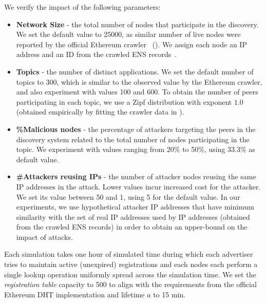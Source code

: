 We verify the impact of the following parameters:
 \begin{itemize}
     \item \textbf{Network Size} - the total number of nodes that participate in the discovery. We set the default value to 25000, as similar number of live nodes were reported by the official Ethereum crawler~\cite{discv4-dns-lists} (). We assign each node an IP address and an ID from the crawled ENS records~\cite{bauer2022ethereum}.%
     \item \textbf{Topics} - the number of distinct applications. We set the default number of topics to 300, which is similar to the observed value by the Ethereum crawler, and also experiment with values 100 and 600. To obtain the number of peers participating in each topic, we use a Zipf distribution with exponent $1.0$ (obtained empirically by fitting the crawler data in ). 
     \item \textbf{\%Malicious nodes} - the percentage of attackers targeting the peers in the discovery system related to the total number of nodes participating in the topic. We experiment with values ranging from 20\% to 50\%,  using 33.3\% as default value.%
     \item \textbf{\#Attackers reusing IPs} - the number of attacker nodes reusing the same IP addresses in the attack. Lower values incur increased cost for the attacker. We set its value between 50 and 1, using 5 for the default value.  In our experiments, we use hypothetical attacker IP addresses that have minimum similarity with the set of real IP addresses used by IP addresses (obtained from the crawled ENS records) in order to obtain an upper-bound on the impact of attacks. %

 \end{itemize}


Each simulation takes one hour of simulated time during which each advertiser tries to maintain active (\ie unexpired) registrations and each nodes each perform a single lookup operation uniformly spread across the simulation time.  We set the \emph{registration table} capacity to 500 to align with the requirements from the official Ethereum DHT implementation and lifetime $a$ to 15 min.%

